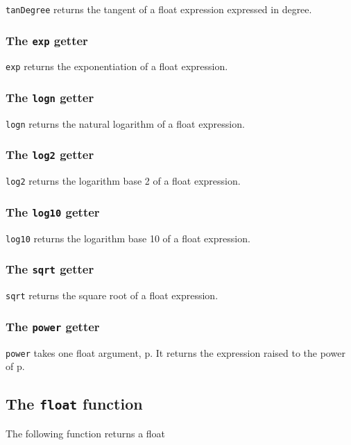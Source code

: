 \documentclass[10pt,openright,twosides,final]{memoir}
\newcommand{\gtltype}[1]{{\small\ttfamily #1}}
\newcommand{\gtlarg}[1]{{\footnotesize\ttfamily\colorbox{light-blue}{#1}}}
\newcommand{\gtlinline}[1]{\colorbox{light-blue}{\lstinline[language=gtl]{#1}}}
\begin{document}
\gtlinline{tanDegree} returns the tangent of a float expression expressed in degree.

\subsubsection{The \texttt{exp} getter}

\gtlinline{exp} returns the exponentiation of a float expression.

\subsubsection{The \texttt{logn} getter}

\gtlinline{logn} returns the natural logarithm of a float expression.

\subsubsection{The \texttt{log2} getter}

\gtlinline{log2} returns the logarithm base 2 of a float expression.
  
\subsubsection{The \texttt{log10} getter}

\gtlinline{log10} returns the logarithm base 10 of a float expression.

\subsubsection{The \texttt{sqrt} getter}

\gtlinline{sqrt} returns the square root of a float expression.

\subsubsection{The \texttt{power} getter}

\gtlinline{power} takes one \gtltype{float} argument, \gtlarg{p}. It returns the expression raised to the  power of \gtlarg{p}.

\subsection{The \texttt{float} function}

The following function returns a \gtltype{float}
\end{document}
